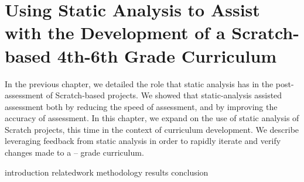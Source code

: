 \chapter{Using Static Analysis to Assist with the Development of a
  Scratch-based 4th-6th Grade Curriculum}
\label{chap:curriculum}

\def\currentprefix{curriculum}

In the previous chapter, we detailed the role that static analysis has in the
post-assessment of Scratch-based projects. We showed that static-analysis
assisted assessment both by reducing the speed of assessment, and by improving
the accuracy of assessment. In this chapter, we expand on the use of static
analysis of Scratch projects, this time in the context of curriculum
development. We describe leveraging feedback from static analysis in order to
rapidly iterate and verify changes made to a  --  grade
curriculum.

{introduction}
{relatedwork}
{methodology}
{results}
{conclusion}
